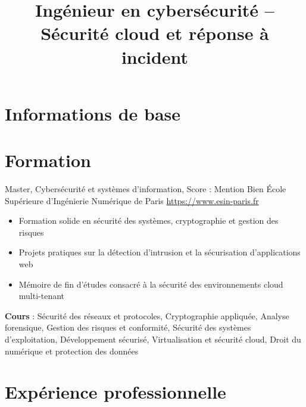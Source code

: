 \documentclass[a4paper, serif, 10pt]{moderncv}
\title{Ingénieur en cybersécurité – Sécurité cloud et réponse à incident}
\begin{document}
\maketitle

\section{Informations de base}

\section{Formation}

        {Master, Cybersécurité et systèmes d'information, Score : Mention Bien}
        {École Supérieure d'Ingénierie Numérique de Paris}
        {\url{https://www.esin-paris.fr}}
        {}
        {\begin{itemize}
\item Formation solide en sécurité des systèmes, cryptographie et gestion des risques
\item Projets pratiques sur la détection d'intrusion et la sécurisation d'applications web
\item Mémoire de fin d'études consacré à la sécurité des environnements cloud multi-tenant
\end{itemize}
\textbf{Cours} : Sécurité des réseaux et protocoles, Cryptographie appliquée, Analyse forensique, Gestion des risques et conformité, Sécurité des systèmes d'exploitation, Développement sécurisé, Virtualisation et sécurité cloud, Droit du numérique et protection des données}
\section{Expérience professionnelle}
\end{document}
